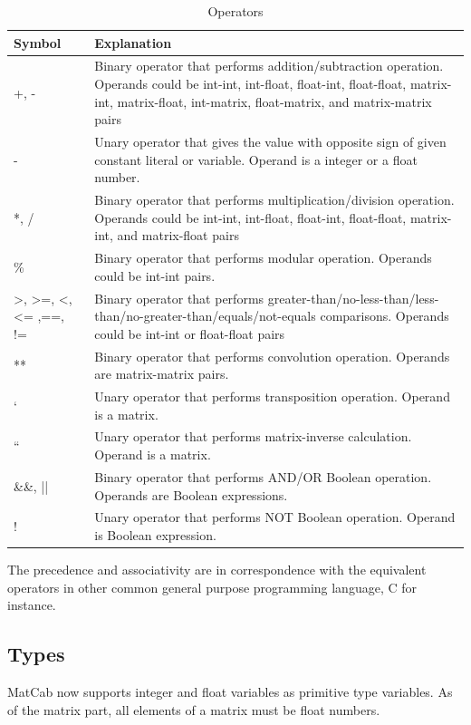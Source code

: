 \documentclass[12pt]{article} %
\begin{document}
\begin{table}
\centering
\caption{Operators}
\begin{tabular}{|p{1cm}|p{12cm}|} \hline
Symbol & Explanation\\ \hline
+, - &  Binary operator that performs addition/subtraction operation. Operands could be int-int, int-float, float-int, float-float, matrix-int, matrix-float, int-matrix, float-matrix, and matrix-matrix pairs \\ \hline
-   & Unary operator that gives the value with opposite sign of given constant literal or variable. Operand is a integer or a float number. \\ \hline
*, /  &  Binary operator that performs multiplication/division operation. Operands could be int-int, int-float, float-int, float-float, matrix-int, and matrix-float pairs \\ \hline
\% &  Binary operator that performs modular operation. Operands could be int-int pairs. \\ \hline
>, >=, <, <= ,==, != &  Binary operator that performs greater-than/no-less-than/less-than/no-greater-than/equals/not-equals comparisons. Operands could be int-int or float-float pairs  \\ \hline
** & Binary operator that performs convolution operation. Operands are matrix-matrix pairs. \\ \hline
‘   &Unary operator that performs transposition operation. Operand is a matrix. \\ \hline
“  & Unary operator that performs matrix-inverse calculation. Operand is a matrix. \\ \hline
\&\&, || & Binary operator that performs AND/OR Boolean operation. Operands are Boolean expressions.\\ \hline
!   & Unary operator that performs NOT Boolean operation. Operand is Boolean expression.\\ \hline

\end{tabular}
\end{table}

The precedence and associativity are in correspondence with the equivalent operators in other common general purpose programming language, C for instance.
\subsection{Types} 
MatCab now supports integer and float variables as primitive type variables. As of the matrix part, all elements of a matrix must be float numbers.
\end{document}
